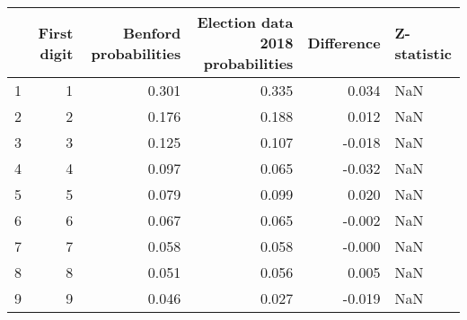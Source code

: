 \begin{tabular}{lrrrrl}
\toprule
 & First digit & Benford probabilities & Election data 2018 probabilities & Difference & Z-statistic \\
\midrule
1 & 1 & 0.301 & 0.335 & 0.034 & NaN \\
2 & 2 & 0.176 & 0.188 & 0.012 & NaN \\
3 & 3 & 0.125 & 0.107 & -0.018 & NaN \\
4 & 4 & 0.097 & 0.065 & -0.032 & NaN \\
5 & 5 & 0.079 & 0.099 & 0.020 & NaN \\
6 & 6 & 0.067 & 0.065 & -0.002 & NaN \\
7 & 7 & 0.058 & 0.058 & -0.000 & NaN \\
8 & 8 & 0.051 & 0.056 & 0.005 & NaN \\
9 & 9 & 0.046 & 0.027 & -0.019 & NaN \\
\bottomrule
\end{tabular}

